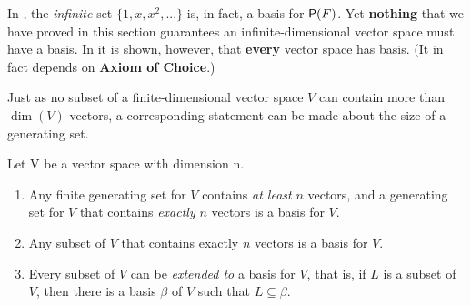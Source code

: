 In , the \emph{infinite} \LID{} set \(\{1, x, x^2, ... \}\) is, in fact, a basis for \(\textsf{P}(F)\).
Yet \textbf{nothing} that we have proved in this section guarantees an infinite-dimensional vector space must have a basis.
In  it is shown, however, that \textbf{every} vector space has basis. (It in fact depends on \textbf{Axiom of Choice}.)

Just as no \LID{} subset of a finite-dimensional vector space \(V\) can contain more than \(\dim(V)\) vectors, a corresponding statement can be
made about the size of a generating set.

\begin{corollary} \label{corollary 1.10.3}
Let V be a vector space with dimension n.
\begin{enumerate}
\item Any finite generating set for \(V\) contains \emph{at least} \(n\) vectors, and a generating set for \(V\) that contains \emph{exactly} \(n\) vectors is a basis for \(V\).
\item Any \LID{} subset of \(V\) that contains exactly \(n\) vectors is a basis for \(V\).
\item Every \LID{} subset of \(V\) can be \textit{extended to} a basis for \(V\),
    that is, if \(L\) is a \LID{} subset of \(V\), then there is a basis \(\beta\) of \(V\) such that \(L \subseteq \beta\).
\end{enumerate}
\end{corollary}

